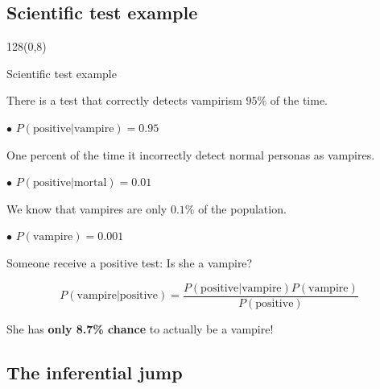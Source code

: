 \documentclass[shownotes]{beamer}
\begin{document}
\subsection{Scientific test example}

\begin{frame}
\begin{textblock}{128}(0,8)
\begin{center}
 \large Scientific test example
\end{center}
\end{textblock}
\vspace{0.5cm}


{ \footnotesize
 There is a test that correctly detects vampirism $95\%$ of the time.
 
 $\bullet$ $P(\text{positive}|\text{vampire})=0.95$
 
 \pause \medskip 

 One percent of the time it incorrectly detect normal personas as vampires.
 
 $\bullet$ $P(\text{positive}|\text{mortal})=0.01$
 
 \pause \medskip 
 
 We know that vampires are only $0.1\%$ of the population. 
 
 $\bullet$ $P(\text{vampire})=0.001$

}

\pause

\begin{center}
 Someone receive a positive test: Is she a vampire?
\end{center}
\pause
\begin{equation*}
 P(\text{vampire}|\text{positive}) = \frac{P(\text{positive}|\text{vampire})P(\text{vampire})}{P(\text{positive})}
\end{equation*}

\pause

\begin{center}
 She has \textbf{only 8.7\% chance} to actually be a vampire!
\end{center}




\end{frame}

\subsection{The inferential jump}
\end{document}
